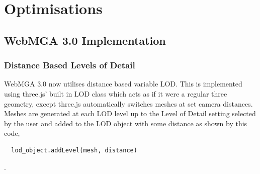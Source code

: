 \section{Optimisations}
\subsection{WebMGA 3.0 Implementation}
\subsubsection{Distance Based Levels of Detail}
\label{optim_lod}
WebMGA 3.0 now utilises distance based variable LOD. This is implemented using three.js' built in LOD class \cite{lod_three} which acts as if it were a regular three geometry, except three.js automatically switches meshes at set camera distances. Meshes are generated at each LOD level up to the Level of Detail setting selected by the user and added to the LOD object with some distance as shown by this code,
\begin{lstlisting}
  lod_object.addLevel(mesh, distance)
\end{lstlisting}.

